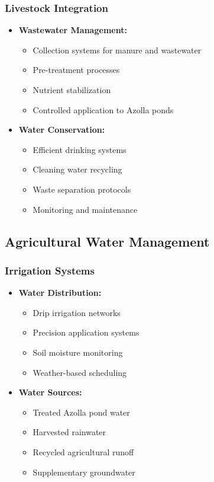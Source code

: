 \subsubsection{Livestock Integration}
\begin{itemize}
    \item \textbf{Wastewater Management:}
    \begin{itemize}
        \item Collection systems for manure and wastewater
        \item Pre-treatment processes
        \item Nutrient stabilization
        \item Controlled application to Azolla ponds
    \end{itemize}
    
    \item \textbf{Water Conservation:}
    \begin{itemize}
        \item Efficient drinking systems
        \item Cleaning water recycling
        \item Waste separation protocols
        \item Monitoring and maintenance
    \end{itemize}
\end{itemize}

\subsection{Agricultural Water Management}

\subsubsection{Irrigation Systems}
\begin{itemize}
    \item \textbf{Water Distribution:}
    \begin{itemize}
        \item Drip irrigation networks
        \item Precision application systems
        \item Soil moisture monitoring
        \item Weather-based scheduling
    \end{itemize}
    
    \item \textbf{Water Sources:}
    \begin{itemize}
        \item Treated Azolla pond water
        \item Harvested rainwater
        \item Recycled agricultural runoff
        \item Supplementary groundwater
    \end{itemize}
\end{itemize}

